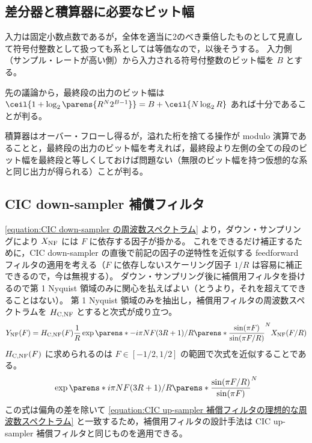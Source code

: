     \subsection{差分器と積算器に必要なビット幅}
        入力は固定小数点数であるが，全体を適当に2のべき乗倍したものとして見直して符号付整数として扱っても系としては等価なので，以後そうする。
        入力側（サンプル・レートが高い側）から入力される符号付整数のビット幅を $B$ とする。
        \par
        先の議論から，最終段の出力のビット幅は $\ceil{1 + \log_2\parens{R^N 2^{B-1}}} = B + \ceil{N\log_2 R}$ あれば十分であることが判る。
        \par
        積算器はオーバー・フローし得るが，溢れた桁を捨てる操作が modulo 演算であることと，最終段の出力のビット幅を考えれば，最終段より左側の全ての段のビット幅を最終段と等しくしておけば問題ない（無限のビット幅を持つ仮想的な系と同じ出力が得られる）ことが判る。
    \subsection{CIC down-sampler 補償フィルタ}
        \cref{equation:CIC down-sampler の周波数スペクトラム} より，ダウン・サンプリングにより $X_\text{NF}$ には $F$ に依存する因子が掛かる。
        これをできるだけ補正するために，CIC down-sampler の直後で前記の因子の逆特性を近似する feedforward フィルタの適用を考える（$F$ に依存しないスケーリング因子 $1/R$ は容易に補正できるので，今は無視する）。
        ダウン・サンプリング後に補償用フィルタを掛けるので第 1 Nyquist 領域のみに関心を払えばよい（とうより，それを超えてできることはない）。
        第 1 Nyquist 領域のみを抽出し，補償用フィルタの周波数スペクトラムを $H_\text{C,NF}$ とすると次式が成り立つ。
        \[ \YNF(F) = \HCNF(F) \frac{1}{R} \exp\parens*{-i\pi N F(3R+1)/R}\parens*{\frac{\sin(\pi F)}{\sin(\pi F/R)}}^N \XNF(F/R) \]
        $H_\text{C,NF}(F)$ に求められるのは $F \in [-1/2,1/2]$ の範囲で次式を近似することである。
        \begin{equation}
            \exp\parens*{i\pi N F(3R+1)/R}\parens*{\frac{\sin(\pi F/R)}{\sin(\pi F)}}^N
        \end{equation}
        この式は偏角の差を除いて \cref{equation:CIC up-sampler 補償フィルタの理想的な周波数スペクトラム} と一致するため，補償用フィルタの設計手法は CIC up-sampler 補償フィルタと同じものを適用できる。
